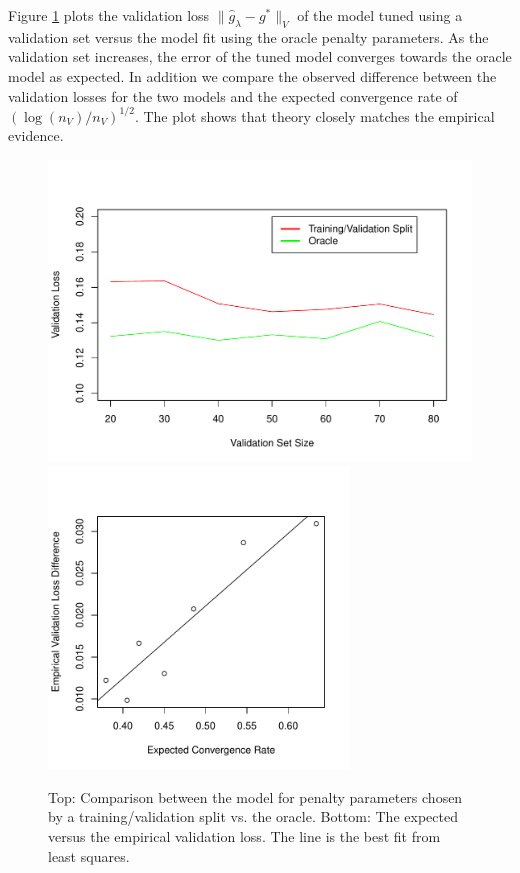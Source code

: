 \documentclass[12pt]{article}
\begin{document}
Figure \ref{fig:emp_v_theory} plots the validation loss $\| \hat{g}_{\lambda} - g^* \|_V$ of the model tuned using a validation set versus the model fit using the oracle penalty parameters. As the validation set increases, the error of the tuned model converges towards the oracle model as expected. In addition we compare the observed difference between the validation losses for the two models and the expected convergence rate of $(\log(n_V)/n_V)^{1/2}$. The plot shows that theory closely matches the empirical evidence.

\begin{figure}
\label{fig:emp_v_theory}
\caption{Top: Comparison between the model for penalty parameters chosen by a training/validation split vs. the oracle. Bottom: The expected versus the empirical validation loss. The line is the best fit from least squares.}
\centering
\includegraphics[height=80mm]{../R/figures/validation_size_loss.pdf}
\includegraphics[height=80mm]{../R/figures/qqplot.pdf}
\end{figure}
\end{document}
